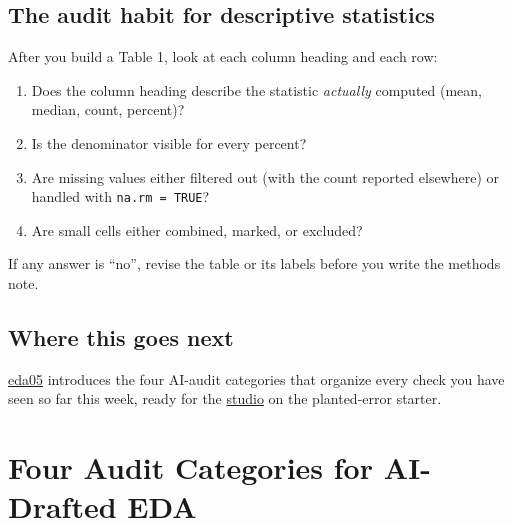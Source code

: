 \documentclass[
  letterpaper,
  DIV=11,
  numbers=noendperiod,
  oneside]{scrreprt}
\providecommand{\tightlist}{%
  \setlength{\itemsep}{0pt}\setlength{\parskip}{0pt}}
\begin{document}
\section*{The audit habit for descriptive
statistics}\label{the-audit-habit-for-descriptive-statistics}


After you build a Table 1, look at each column heading and each row:

\begin{enumerate}
\def\labelenumi{\arabic{enumi}.}
\tightlist
\item
  Does the column heading describe the statistic \emph{actually}
  computed (mean, median, count, percent)?
\item
  Is the denominator visible for every percent?
\item
  Are missing values either filtered out (with the count reported
  elsewhere) or handled with \texttt{na.rm\ =\ TRUE}?
\item
  Are small cells either combined, marked, or excluded?
\end{enumerate}

If any answer is ``no'', revise the table or its labels before you write
the methods note.

\section*{Where this goes next}\label{where-this-goes-next-10}


\href{eda05-ai-audit-categories.qmd}{eda05} introduces the four AI-audit
categories that organize every check you have seen so far this week,
ready for the \href{eda06-studio-planted-errors.qmd}{studio} on the
planted-error starter.

\chapter*{Four Audit Categories for AI-Drafted
EDA}\label{four-audit-categories-for-ai-drafted-eda}

\end{document}
